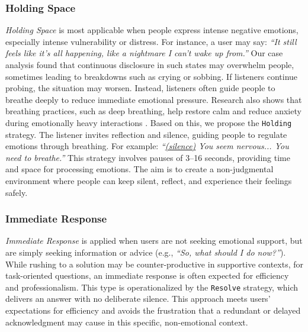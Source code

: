 \subsubsection{Holding Space}
\emph{Holding Space} is most applicable when people express intense negative emotions, especially intense vulnerability or distress. For instance, a user may say: \textit{``It still feels like it's all happening, like a nightmare I can't wake up from.''} Our case analysis found that continuous disclosure in such states may overwhelm people, sometimes leading to breakdowns such as crying or sobbing. If listeners continue probing, the situation may worsen. Instead, listeners often guide people to breathe deeply to reduce immediate emotional pressure. Research also shows that breathing practices, such as deep breathing, help restore calm and reduce anxiety during emotionally heavy interactions \cite{joseph2022effects}. Based on this, we propose the \texttt{Holding} strategy. The listener invites reflection and silence, guiding people to regulate emotions through breathing. For example: \textit{``\underline{(silence)} You seem nervous... You need to breathe.''} This strategy involves pauses of 3–16 seconds, providing time and space for processing emotions. The aim is to create a non-judgmental environment where people can keep silent, reflect, and experience their feelings safely.  

\subsubsection{Immediate Response}
\emph{Immediate Response} is applied when users are not seeking emotional support, but are simply seeking information or advice (e.g., \textit{``So, what should I do now?''}). While rushing to a solution may be counter-productive in supportive contexts, for task-oriented questions, an immediate response is often expected for efficiency and professionalism. This type is operationalized by the \texttt{Resolve} strategy, which delivers an answer with no deliberate silence. This approach meets users' expectations for efficiency and avoids the frustration that a redundant or delayed acknowledgment may cause in this specific, non-emotional context.




